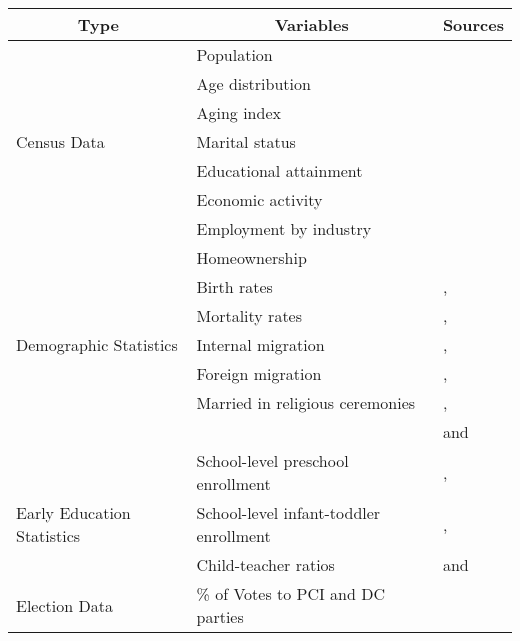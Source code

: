 \begin{tabular}{lll}
\toprule
\multicolumn{1}{c}{Type}	&	\multicolumn{1}{c}{Variables}	&	\multicolumn{1}{c}{Sources}	\\
\midrule
			&	Population & \\
			& 	Age distribution & \\
			&	Aging index & \\
Census Data	&	Marital status & \citet{Istat_2014_Atlante-Statistico} \\
			& 	Educational attainment & \\
			& 	Economic activity & \\
			& 	Employment by industry & \\
			& 	Homeownership	&	\\
\midrule
						&		Birth rates 			&	\citet{Reggio-Emilia-Admin-Data_1966-2010}, \\
						&	Mortality rates		& 	\citet{Padova-Admin-Data_1964-2010}, 	\\
	Demographic Statistics	&	 Internal migration 		&	\citet{Statistica-Regionae_2016_Veneto}, \\
						&	Foreign migration 	&  	\citet{Emilia-Romagna_2016_Population},\\
						&	Married in religious ceremonies		&	\citet{Statistica-Regionae_2016_Veneto}, \\
						& 	& 	and \citet{Istat_2016_Geo-Demo} \\
\midrule
						&	School-level preschool enrollment	 &	\citet{Reggio-Annual-Journals_1994-2011}, \\
	Early Education Statistics	& 	School-level infant-toddler enrollment & 	\citet{Padova-Admin-Data_1964-2010},  \\
						& 	Child-teacher ratios				&	and \citet{Reggio-Emilia-Admin-Data_1966-2010} \\
\midrule
Election Data				&	\% of Votes to PCI and DC parties 	&	\citet{Archivo-Storico_2016} \\
\bottomrule
\end{tabular}

